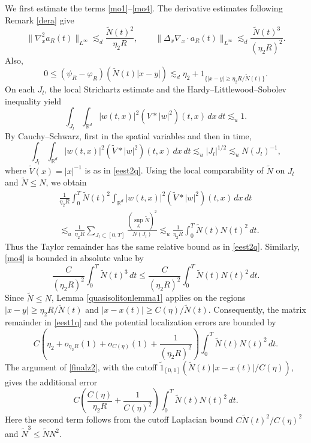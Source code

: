 \documentclass[reqno,11pt]{amsart}
\theoremstyle{plain}
\theoremstyle{definition}
\numberwithin{equation}{section}
\numberwithin{theorem}{section}
\def\geq{\geqslant}
\def\leq{\leqslant}
\def\R{\mathbb{R}}
\begin{document}
We first estimate the terms \eqref{mo1}--\eqref{mo4}. The derivative
estimates following Remark \ref{dera} give
\[
 \|\nabla_x^2a_R(t)\|_{L^\infty}
 \lesssim_d\frac{\tilde N(t)^2}{\eta_2R},\qquad
 \|\Delta_x\nabla_x\cdot a_R(t)\|_{L^\infty}
 \lesssim_d\frac{\tilde N(t)^3}{(\eta_2R)^2}.
\]
Also,
\[
 0\leq(\psi_R-\varphi_R)(\tilde N(t)|x-y|)
 \lesssim_d\eta_2+
 1_{\{|x-y|\geq\eta_2R/\tilde N(t)\}}.
\]
On each $J_l$, the local Strichartz estimate and the Hardy--Littlewood--Sobolev
inequality yield
\[
 \int_{J_l}\int_{\R^d}|w(t,x)|^2(V*|w|^2)(t,x)\,dx\,dt
 \lesssim_u1.
\]
By Cauchy--Schwarz, first in the spatial variables and then in time,
\[
 \int_{J_l}\int_{\R^d}|w(t,x)|^2(\tilde V*|w|^2)(t,x)\,dx\,dt
 \lesssim_u|J_l|^{1/2}\lesssim_u N(J_l)^{-1},
\]
where $\tilde V(x)=|x|^{-1}$ is as in \eqref{eest2q}. Using the local
comparability of $\tilde N$ on $J_l$ and $\tilde N\leq N$, we obtain
\begin{align*}
 &\frac1{\eta_2R}\int_0^T\tilde N(t)^2
       \int_{\R^d}|w(t,x)|^2(\tilde V*|w|^2)(t,x)\,dx\,dt\\
 &\lesssim_u\frac1{\eta_2R}\sum_{J_l\subset[0,T]}
                  \frac{(\sup_{J_l}\tilde N)^2}{N(J_l)}
 \lesssim_u\frac1{\eta_2R}\int_0^T\tilde N(t)N(t)^2\,dt.
\end{align*}
Thus the Taylor remainder has the same relative bound as in \eqref{eest2q}.
Similarly, \eqref{mo4} is bounded in absolute value by
\[
 \frac{C}{(\eta_2R)^2}\int_0^T\tilde N(t)^3\,dt
 \leq\frac{C}{(\eta_2R)^2}\int_0^T\tilde N(t)N(t)^2\,dt.
\]
Since $\tilde N\leq N$, Lemma \ref{quasisolitonlemma1} applies on the regions
$|x-y|\geq\eta_2R/\tilde N(t)$ and
$|x-x(t)|\geq C(\eta)/\tilde N(t)$. Consequently, the matrix remainder in
\eqref{eest1q} and the potential localization errors are bounded by
\[
 C\left(\eta_2+o_{\eta_2R}(1)+o_{C(\eta)}(1)
                  +\frac1{(\eta_2R)^2}\right)
       \int_0^T\tilde N(t)N(t)^2\,dt.
\]
The argument of \eqref{finalz2}, with the cutoff
$\tilde{1}_{[0,1]}(\tilde N(t)|x-x(t)|/C(\eta))$, gives the additional error
\[
 C\left(\frac{C(\eta)}{\eta_2R}+\frac1{C(\eta)^2}\right)
       \int_0^T\tilde N(t)N(t)^2\,dt.
\]
Here the second term follows from the cutoff Laplacian bound
$C\tilde N(t)^2/C(\eta)^2$ and $\tilde N^3\leq\tilde NN^2$.
\end{document}
